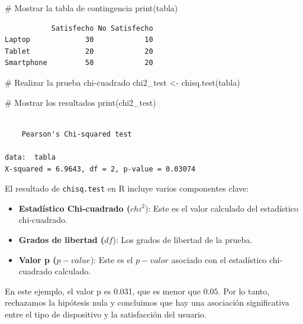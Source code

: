 \documentclass[
  letterpaper,
  DIV=11,
  numbers=noendperiod]{scrreprt}
\newenvironment{Shaded}{\begin{snugshade}}{\end{snugshade}}
\newcommand{\CommentTok}[1]{\textcolor[rgb]{0.37,0.37,0.37}{#1}}
\newcommand{\FunctionTok}[1]{\textcolor[rgb]{0.28,0.35,0.67}{#1}}
\newcommand{\NormalTok}[1]{\textcolor[rgb]{0.00,0.23,0.31}{#1}}
\newcommand{\OtherTok}[1]{\textcolor[rgb]{0.00,0.23,0.31}{#1}}
\providecommand{\tightlist}{%
  \setlength{\itemsep}{0pt}\setlength{\parskip}{0pt}}\usepackage{longtable,booktabs,array}
\begin{document}
\begin{tcolorbox}
\begin{Shaded}
\begin{Highlighting}[]
\CommentTok{\# Mostrar la tabla de contingencia}
\FunctionTok{print}\NormalTok{(tabla)}
\end{Highlighting}
\end{Shaded}

\begin{verbatim}
           Satisfecho No Satisfecho
Laptop             30            10
Tablet             20            20
Smartphone         50            20
\end{verbatim}

\begin{Shaded}
\begin{Highlighting}[]
\CommentTok{\# Realizar la prueba chi{-}cuadrado}
\NormalTok{chi2\_test }\OtherTok{\textless{}{-}} \FunctionTok{chisq.test}\NormalTok{(tabla)}

\CommentTok{\# Mostrar los resultados}
\FunctionTok{print}\NormalTok{(chi2\_test)}
\end{Highlighting}
\end{Shaded}

\begin{verbatim}

    Pearson's Chi-squared test

data:  tabla
X-squared = 6.9643, df = 2, p-value = 0.03074
\end{verbatim}

El resultado de \texttt{chisq.test} en R incluye varios componentes
clave:

\begin{itemize}
\tightlist
\item
  \textbf{Estadístico Chi-cuadrado (}\(chi^2\)): Este es el valor
  calculado del estadístico chi-cuadrado.
\item
  \textbf{Grados de libertad (}\(df\)): Los grados de libertad de la
  prueba.
\item
  \textbf{Valor p (}\(p-value\)): Este es el \(p-valor\) asociado con el
  estadístico chi-cuadrado calculado.
\end{itemize}

En este ejemplo, el valor p es 0.031, que es menor que \(0.05\). Por lo
tanto, rechazamos la hipótesis nula y concluimos que hay una asociación
significativa entre el tipo de dispositivo y la satisfacción del
usuario.

\end{tcolorbox}
\end{document}
